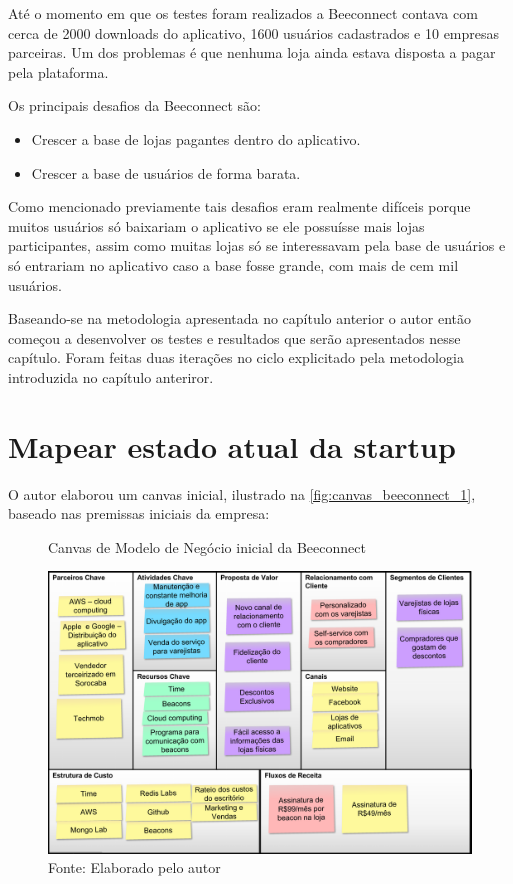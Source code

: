 Até o momento em que os testes foram realizados a Beeconnect contava com cerca de 2000 downloads do aplicativo, 1600 usuários cadastrados e 10 empresas parceiras. Um dos problemas é que nenhuma loja ainda estava disposta a pagar pela plataforma.

Os principais desafios da Beeconnect são:
\begin{itemize}
\item Crescer a base de lojas pagantes dentro do aplicativo.
\item Crescer a base de usuários de forma barata.
\end{itemize}

Como mencionado previamente tais desafios eram realmente difíceis porque muitos usuários só baixariam o aplicativo se ele possuísse mais lojas participantes, assim como muitas lojas só se interessavam pela base de usuários e só entrariam no aplicativo caso a base fosse grande, com mais de cem mil usuários.

Baseando-se na metodologia apresentada no capítulo anterior o autor então começou a desenvolver os testes e resultados que serão apresentados nesse capítulo. Foram feitas duas iterações no ciclo explicitado pela metodologia introduzida no capítulo anteriror.

\section{Mapear estado atual da startup}
\label{cha:mapear_estado}
O autor elaborou um canvas inicial, ilustrado na \autoref{fig:canvas_beeconnect_1}, baseado nas premissas iniciais da empresa: 

\begin{figure}[H]
\caption{Canvas de Modelo de Negócio inicial da Beeconnect}
\centerline{\includegraphics[scale=0.25]{img/canvas_beeconnect_1}}
\label{fig:canvas_beeconnect_1}
\caption* {Fonte: Elaborado pelo autor}
\end{figure}

